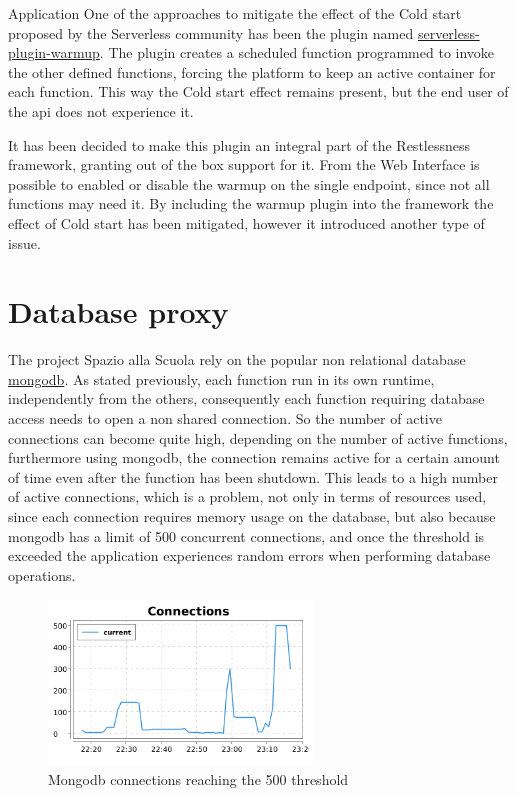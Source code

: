\begin{chapter}{Application}
    One of the approaches to mitigate the effect of the Cold start proposed by the
    Serverless community has been the plugin named
    \href{https://www.npmjs.com/package/serverless-plugin-warmup}{serverless-plugin-warmup}.
    The plugin creates a scheduled function programmed to invoke the other defined functions,
    forcing the platform to keep an active container for each function.
    This way the Cold start effect remains present, but the end user of the api does
    not experience it.

    It has been decided to make this plugin an integral part of the Restlessness framework,
    granting out of the box support for it. From the Web Interface is possible to
    enabled or disable the warmup on the single endpoint, since not all functions may
    need it.
    By including the warmup plugin into the framework the effect of Cold start has
    been mitigated, however it introduced another type of issue.

    \section{Database proxy}
    The project Spazio alla Scuola rely on the popular non relational database
    \href{https://www.mongodb.com}{mongodb}. As stated previously, each function
    run in its own runtime, independently from the others, consequently each function
    requiring database access needs to open a non shared connection.
    So the number of active connections can become quite high, depending on the number
    of active functions, furthermore using mongodb, the connection remains active for
    a certain amount of time even after the function has been shutdown.
    This leads to a high number of active connections, which is a problem, not only
    in terms of resources used, since each connection requires memory usage on the
    database, but also because mongodb has a limit of 500 concurrent connections,
    and once the threshold is exceeded the application experiences random errors when
    performing database operations.
    \begin{figure}
        \centering
        \includegraphics[width=7cm]{source/images/mongo-connections.png}
        \caption{Mongodb connections reaching the 500 threshold}
    \end{figure}


\end{chapter}
